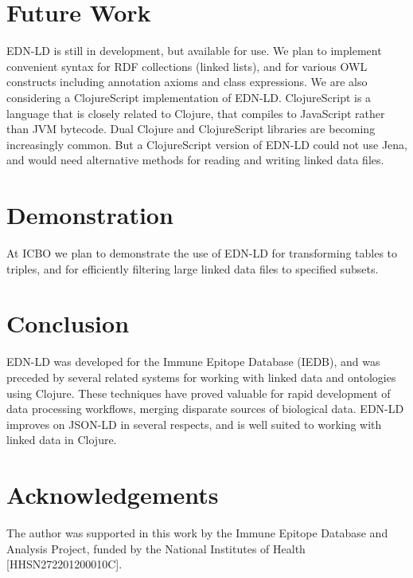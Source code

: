 \documentclass{icbo}
\begin{document}
\section{Future Work}

EDN-LD is still in development, but available for use. We plan to implement convenient syntax for RDF collections (linked lists), and for various OWL constructs including annotation axioms and class expressions. We are also considering a ClojureScript implementation of EDN-LD. ClojureScript is a language that is closely related to Clojure, that compiles to JavaScript rather than JVM bytecode. Dual Clojure and ClojureScript libraries are becoming increasingly common. But a ClojureScript version of EDN-LD could not use Jena, and would need alternative methods for reading and writing linked data files.


\section{Demonstration}

At ICBO we plan to demonstrate the use of EDN-LD for transforming tables to triples, and for efficiently filtering large linked data files to specified subsets.


\section{Conclusion}

EDN-LD was developed for the Immune Epitope Database (IEDB), and was preceded by several related systems for working with linked data and ontologies using Clojure. These techniques have proved valuable for rapid development of data processing workflows, merging disparate sources of biological data. EDN-LD improves on JSON-LD in several respects, and is well suited to working with linked data in Clojure.


\section*{Acknowledgements}

The author was supported in this work by the Immune Epitope Database and Analysis Project, funded by the National Institutes of Health [HHSN272201200010C].





\end{document}
